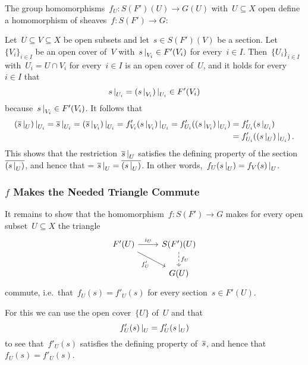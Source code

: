 The group homomorphisms~$f_U \colon S(F')(U) \to G(U)$ with~$U \subseteq X$ open define a homomorphism of sheaves~$f \colon S(F') \to G$:

Let~$U \subseteq V \subseteq X$ be open subsets and let~$s \in S(F')(V)$ be a section.
Let~$\{ V_i \}_{i \in I}$ be an open cover of~$V$ with~$\restrict{s}{V_i} \in F'(V_i)$ for every~$i \in I$.
Then~$\{ U_i \}_{i \in I}$ with~$U_i = U \cap V_i$ for every~$i \in I$ is an open cover of~$U$, and it holds for every~$i \in I$ that
\[
      \restrict{s}{U_i}
  =   \restrict{(\restrict{s}{V_i})}{U_i}
  \in F'(V_i)
\]
because~$\restrict{s}{V_i} \in F'(V_i)$.
It follows that
\begin{align*}
      \restrict{ (\restrict{\induced{s}}{U}) }{U_i}
   =  \restrict{ \induced{s} }{U_i}
   =  \restrict{ (\restrict{\induced{s}}{V_i}) }{U_i}
   =  \restrict{f'_{V_i}(\restrict{s}{V_i})}{U_i}
   =  f'_{U_i}( \restrict{ (\restrict{s}{V_i}) }{U_i} )
  &=  f'_{U_i}( \restrict{s}{U_i} ) \\
  &=  f'_{U_i}( \restrict{ (\restrict{s}{U}) }{ U_i} ) \,.
\end{align*}
This shows that the restriction~$\restrict{\induced{s}}{U}$ satisfies the defining property of the section~$\induced{(\restrict{s}{U})}$, and hence that = $\restrict{\induced{s}}{U} = \induced{(\restrict{s}{U})}$.
In other words,~$f_U(\restrict{s}{U}) = \restrict{ f_V(s) }{U}$.



\subsubsection*{$f$ Makes the Needed Triangle Commute}

It remains to show that the homomorphism~$f \colon S(F') \to G$ makes for every open subset~$U \subseteq X$ the triangle
\[
  \begin{tikzcd}
      F'(U)
      \arrow{r}[above]{i_U}
      \arrow{dr}[below left]{f'_U}
    & S(F')(U)
      \arrow[dashed]{d}[right]{f_U}
    \\
    {}
    & G(U)
  \end{tikzcd}
\]
commute, i.e.\ that~$f_U(s) = f'_U(s)$ for every section~$s \in F'(U)$.

For this we can use the open cover~$\{U\}$ of~$U$ and that
\[
    \restrict{f'_U(s)}{U}
  = f'_U( \restrict{s}{U} )
\]
to see that~$f'_U(s)$ satisfies the defining property of~$\overline{s}$, and hence that~$f_U(s) = f'_U(s)$.









